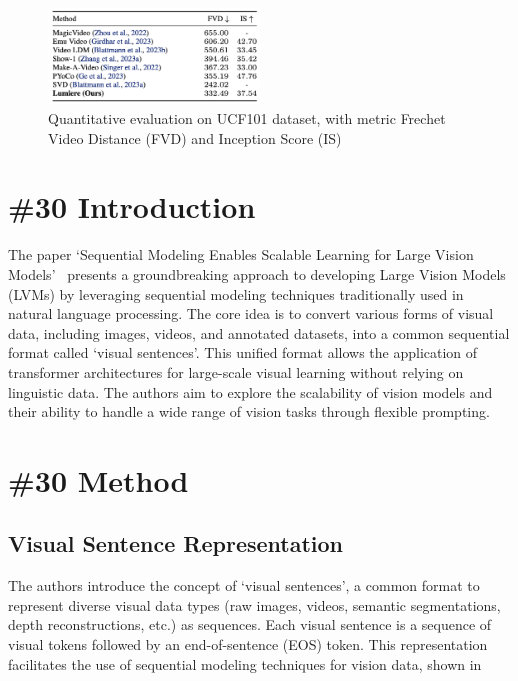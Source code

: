 \documentclass[conference]{IEEEtran}
\theoremstyle{definition}
\theoremstyle{plain}
\theoremstyle{remark}
\begin{document}
\begin{figure}
    \centering
    \includegraphics[width=0.5\textwidth]{UCF101.png}
    \caption{Quantitative evaluation on UCF101 dataset, with metric Frechet Video Distance (FVD) and Inception Score (IS)}
    \label{fig:UCF101}
\end{figure}



\section{\textbf{\#30} Introduction}
The paper `Sequential Modeling Enables Scalable Learning for Large Vision Models'~\cite{bai2023sequential} presents a groundbreaking approach to developing Large Vision Models (LVMs) by leveraging sequential modeling techniques traditionally used in natural language processing. 
The core idea is to convert various forms of visual data, including images, videos, and annotated datasets, into a common sequential format called `visual sentences'. 
This unified format allows the application of transformer architectures for large-scale visual learning without relying on linguistic data. 
The authors aim to explore the scalability of vision models and their ability to handle a wide range of vision tasks through flexible prompting.








\section{\textbf{\#30} Method}
\subsection{Visual Sentence Representation}
The authors introduce the concept of `visual sentences', a common format to represent diverse visual data types (raw images, videos, semantic segmentations, depth reconstructions, etc.) as sequences. 
Each visual sentence is a sequence of visual tokens followed by an end-of-sentence (EOS) token. 
This representation facilitates the use of sequential modeling techniques for vision data, shown in 
\end{document}
